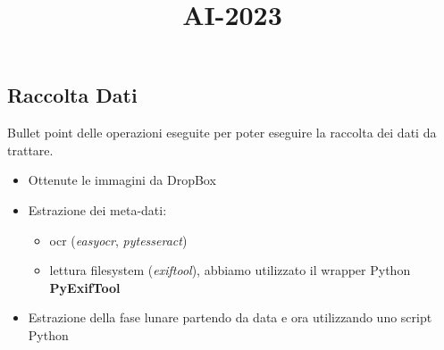 \title{AI-2023}\documentclass[12pt,a4paper,twoside]{article}
\begin{document}
\subsection{Raccolta Dati}
Bullet point delle operazioni eseguite per poter eseguire la raccolta dei dati da trattare.
\begin{itemize}
    \item Ottenute le immagini da DropBox
    \item Estrazione dei meta-dati:
    \begin{itemize}
        \item ocr (\textit{easyocr}, \textit{pytesseract})
        \item lettura filesystem (\textit{exiftool}), abbiamo utilizzato il wrapper Python \textbf{PyExifTool}
    \end{itemize}
    \item Estrazione della fase lunare partendo da data e ora utilizzando uno script Python
\end{itemize}
\end{document}
